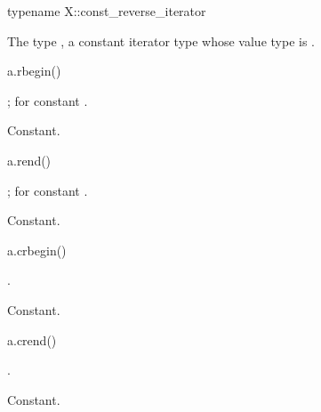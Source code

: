 %
\begin{itemdecl}
typename X::const_reverse_iterator
\end{itemdecl}

\begin{itemdescr}
\pnum
\result
The type ,
a constant iterator type whose value type is .
\end{itemdescr}

%
\begin{itemdecl}
a.rbegin()
\end{itemdecl}

\begin{itemdescr}
\pnum
\result
{};
 for constant .

\pnum
\returns
{}

\pnum
\complexity
Constant.
\end{itemdescr}

%
\begin{itemdecl}
a.rend()
\end{itemdecl}

\begin{itemdescr}
\pnum
\result
{};
 for constant .

\pnum
\returns
{}

\pnum
\complexity
Constant.
\end{itemdescr}

%
\begin{itemdecl}
a.crbegin()
\end{itemdecl}

\begin{itemdescr}
\pnum
\result
{}.

\pnum
\returns
{}

\pnum
\complexity
Constant.
\end{itemdescr}

%
\begin{itemdecl}
a.crend()
\end{itemdecl}

\begin{itemdescr}
\pnum
\result
{}.

\pnum
\returns
{}

\pnum
\complexity
Constant.
\end{itemdescr}

